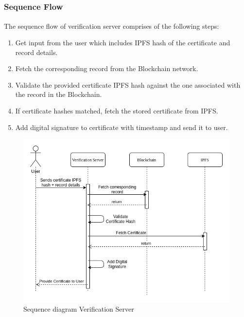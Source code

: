 \documentclass{article}
\begin{document}
        \subsubsection{Sequence Flow}
        \paragraph{}
        The sequence flow of verification server comprises of the following steps:
        \begin{enumerate}
            \item Get input from the user which includes IPFS hash of the certificate and record details.
            \item Fetch the corresponding record from the Blockchain network.
            \item Validate the provided certificate IPFS hash against the one associated with the record in the Blockchain.
            \item If certificate hashes matched, fetch the stored certificate from IPFS.
            \item Add digital signature to certificate with timestamp and send it to user.
        \end{enumerate}
        
        \begin{figure}[H]
                \includegraphics[scale=0.5]{verification_seq.png}
                \centering
                \caption{Sequence diagram Verification Server}
        \end{figure}
        
\end{document}
